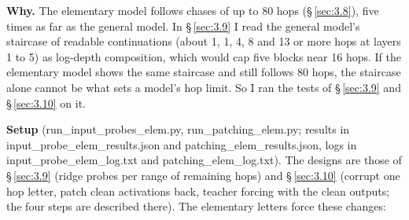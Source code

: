 \documentclass[paper=a4,fontsize=11pt,DIV=11,parskip=half,headings=small,numbers=noendperiod]{scrartcl}
\DeclareRobustCommand{\lead}[1]{\textsf{\bfseries\color{accent}#1}}
\DeclareRobustCommand{\code}[1]{{\fontseries{m}\ttfamily #1}}
\begin{document}
\lead{Why.} The elementary model follows chases of up to 80 hops (\S\,\ref{sec:3.8}), five times as far as the
general model. In \S\,\ref{sec:3.9} I read the general model’s staircase of readable continuations (about 1, 1,
4, 8 and 13 or more hops at layers 1 to 5) as log-depth composition, which would cap five blocks near 16 hops.
If the elementary model shows the same staircase and still follows 80 hops, the staircase alone cannot be what
sets a model’s hop limit. So I ran the tests of \S\,\ref{sec:3.9} and \S\,\ref{sec:3.10} on it.

{\raggedright \lead{Setup}
(\code{run\_\allowbreak{}input\_\allowbreak{}probes\_\allowbreak{}elem.\allowbreak{}py},
\code{run\_\allowbreak{}patching\_\allowbreak{}elem.\allowbreak{}py}; results in
\code{input\_\allowbreak{}probe\_\allowbreak{}elem\_\allowbreak{}results.\allowbreak{}json} and
\code{patching\_\allowbreak{}elem\_\allowbreak{}results.\allowbreak{}json}, logs in
\code{input\_\allowbreak{}probe\_\allowbreak{}elem\_\allowbreak{}log.\allowbreak{}txt} and
\code{patching\_\allowbreak{}elem\_\allowbreak{}log.\allowbreak{}txt}). The designs are those of
\S\,\ref{sec:3.9} (ridge probes per range of remaining hops) and \S\,\ref{sec:3.10} (corrupt one hop letter,
patch clean activations back, teacher forcing with the clean outputs; the four steps are described there). The
elementary letters force these changes:\par}
\end{document}
